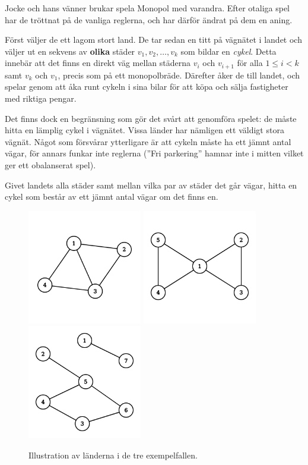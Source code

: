 Jocke och hans vänner brukar spela Monopol med varandra.
Efter otaliga spel har de tröttnat på de vanliga reglerna, och har därför ändrat på dem en aning.

Först väljer de ett lagom stort land.
De tar sedan en titt på vägnätet i landet och väljer ut en sekvens av \textbf{olika} städer $v_1, v_2, \dots, v_k$ som bildar en \emph{cykel}.
Detta innebär att det finns en direkt väg mellan städerna $v_i$ och $v_{i+1}$ för alla $1 \le i < k$ samt $v_k$ och $v_1$, precis som på ett monopolbräde.
Därefter åker de till landet, och spelar genom att åka runt cykeln i sina bilar för att köpa och sälja fastigheter med riktiga pengar.

Det finns dock en begränsning som gör det svårt att genomföra spelet: de måste hitta en lämplig cykel i vägnätet.
Vissa länder har nämligen ett väldigt stora vägnät.
Något som försvårar ytterligare är att cykeln måste ha ett jämnt antal vägar, för annars funkar inte reglerna (''Fri parkering'' hamnar inte
i mitten vilket ger ett obalanserat spel).

Givet landets alla städer samt mellan vilka par av städer det går vägar, hitta en cykel som består av ett jämnt antal vägar om det finns en.

\begin{figure}[!h]
  \centering
  \includegraphics[width=5cm]{sample1.png}
  \quad
  \includegraphics[width=5cm]{sample2.png}
  \quad
  \includegraphics[width=5cm]{sample3.png}
  \caption{Illustration av länderna i de tre exempelfallen.}
\end{figure}

